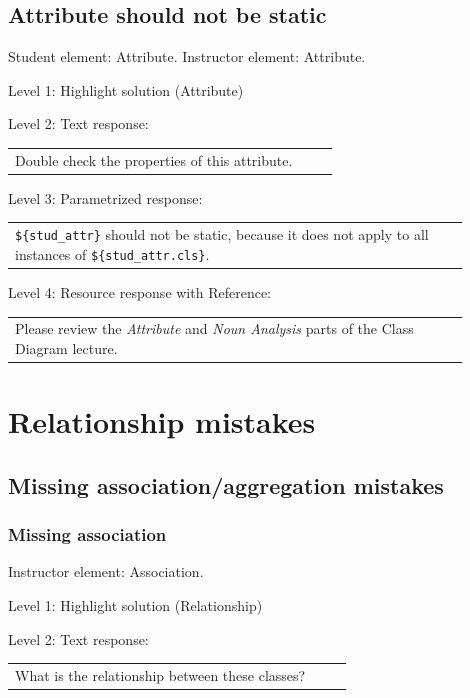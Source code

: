 \subsection{Attribute should not be static}

Student element: Attribute. Instructor element: Attribute. \medskip

\noindent Level 1: Highlight solution (Attribute) \medskip

\noindent Level 2: Text response: \medskip

\begin{tabular}{|p{0.9\linewidth}}
Double check the properties of this attribute.
\end{tabular} \medskip

\noindent Level 3: Parametrized response: \medskip

\begin{tabular}{|p{0.9\linewidth}}
\verb|${stud_attr}| should not be static, because it does not apply to all instances of \verb|${stud_attr.cls}|.
\end{tabular} \medskip

\noindent Level 4: Resource response with Reference: \medskip

\begin{tabular}{|p{0.9\linewidth}}
Please review the \textit{Attribute} and \textit{Noun Analysis} parts of the Class Diagram lecture.
\end{tabular} \medskip



\section{Relationship mistakes}

\subsection{Missing association/aggregation mistakes}

\subsubsection{Missing association}

Instructor element: Association. \medskip

\noindent Level 1: Highlight solution (Relationship) \medskip

\noindent Level 2: Text response: \medskip

\begin{tabular}{|p{0.9\linewidth}}
What is the relationship between these classes?
\end{tabular} \medskip

